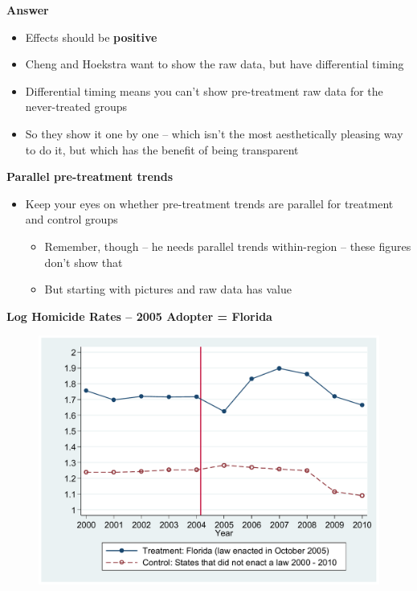 \documentclass[notes=show]{beamer}
\begin{document}
\begin{frame}[plain]
\begin{center}
\textbf{Answer}
\end{center}

\begin{itemize}
	\item Effects should be \textbf{positive}
	\item Cheng and Hoekstra want to show the raw data, but have differential timing
	\item Differential timing means you can't show pre-treatment raw data for the never-treated groups
	\item So they show it one by one -- which isn't the most aesthetically pleasing way to do it, but which has the benefit of being transparent
\end{itemize}

\end{frame}

\begin{frame}[plain]
\begin{center}
\textbf{Parallel pre-treatment trends}
\end{center}

\begin{itemize}
	\item Keep your eyes on whether pre-treatment trends are parallel for treatment and control groups
		\begin{itemize}
		\item Remember, though -- he needs parallel trends within-region -- these figures don't show that
		\item But starting with pictures and raw data has value
		\end{itemize}
	\end{itemize}
\end{frame}


\begin{frame}[plain]
	\begin{center}
	\textbf{Log Homicide Rates -- 2005 Adopter = Florida}
	\end{center}
	
	\begin{figure}
	\includegraphics[scale=0.4]{./lecture_includes/cheng5.pdf}
	\end{figure}
\end{frame}
\end{document}
